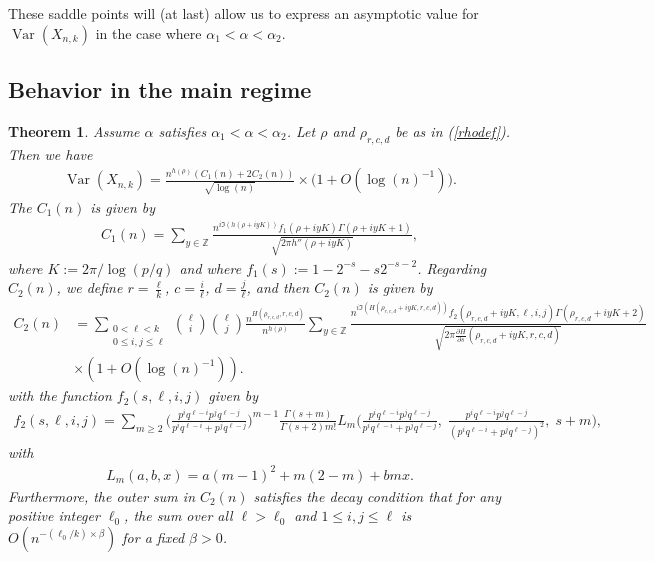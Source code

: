 \documentclass[proceedings]{aofa}
\newtheorem{theorem}{Theorem}
\def\Var{\mathop{\operatorname{Var}}}
\newcommand{\Xnk}{X_{n,k}}
\begin{document}
These saddle points will (at last) allow us to express an asymptotic value for $\Var(X_{n,k})$ in the case where $\alpha_{1} < \alpha < \alpha_{2}$.
\subsection{Behavior in the main regime}
\begin{theorem}\label{saddlepointtheorem}
Assume $\alpha$ satisfies $\alpha_{1} < \alpha <
\alpha_{2}$. Let $\rho$ and $\rho_{r,c,d}$ be as in (\ref{rhodef}). Then we have
\begin{align*}
\Var(\Xnk)=\frac{n^{h(\rho)}(C_{1}(n)+2C_{2}(n)) }{\sqrt{\log(n)}}\times \big(1+O(\log(n)^{-1})\big).
\end{align*}
The $C_{1}(n)$ is given by
\begin{align*}
C_{1}(n)=\sum_{y \in \mathbb{Z}}\frac{n^{i \Im(h(\rho+iyK))}f_{1}(\rho+iyK)\Gamma(\rho+iyK+1)}{\sqrt{2\pi h''(\rho+iyK)}},
\end{align*}
where $K:=2\pi/\log(p/q)$ and where $f_{1}(s):=1-2^{-s}-s2^{-s-2}$.
Regarding $C_{2}(n)$, we define
$r=\frac{\ell}{k}$, $c=\frac{i}{\ell}$, $d=\frac{j}{\ell}$,
and then $C_{2}(n)$ is given by
\begin{align*}
C_{2}(n)&=\sum_{\substack{ 0 < \ell < k \\ 0 \leq i,j \leq \ell}}{\ell \choose i}{\ell \choose j}\frac{n^{H(\rho_{r,c,d},r,c,d)}}{n^{h(\rho)}}\sum_{y \in \mathbb{Z}}\frac{n^{i \Im(H(\rho_{r,c,d}+iyK,r,c,d))}f_{2}(\rho_{r,c,d}+iyK,\ell,i,j)\Gamma(\rho_{r,c,d}+iyK+2)}{\sqrt{2\pi \frac{\partial H}{\partial s}(\rho_{r,c,d}+iyK,r,c,d)}}\\
& \times (1+O(\log(n)^{-1})).
\end{align*}
with the function $f_{2}(s,\ell,i,j)$ given by
\begin{align*}
f_{2}(s,\ell,i,j)=\sum_{m \geq 2} \Big(\frac{p^{i}q^{\ell-i}p^{j}q^{\ell-j}}{p^{i}q^{\ell-i}+p^{j}q^{\ell-j}}\Big)^{m-1}\frac{\Gamma(s+m)}{\Gamma(s+2) m!} L_{m}\Big(\frac{p^{i}q^{\ell-i}p^{j}q^{\ell-j}}{p^{i}q^{\ell-i}+p^{j}q^{\ell-j}}, \;\frac{p^{i}q^{\ell-i}p^{j}q^{\ell-j}}{(p^{i}q^{\ell-i}+p^{j}q^{\ell-j})^{2}},\;s+m\Big),
\end{align*}
with
\begin{align*}
L_{m}(a,b,x)=a(m-1)^{2} +m(2-m)+bmx.
\end{align*}
Furthermore, the outer sum in $C_{2}(n)$ satisfies the decay condition that for any positive integer $\ell_{0}$, the sum over all $\ell>\ell_{0}$ and $1 \leq i,j \leq \ell$ is $O(n^{-(\ell_{0}/k) \times \beta})$ for a fixed $\beta>0$.

\end{theorem}
\end{document}
